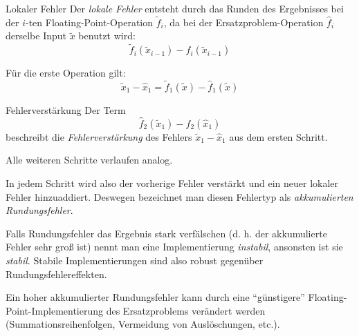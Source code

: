 \begin{defi}{Lokaler Fehler}
    Der \emph{lokale Fehler} entsteht durch das Runden des Ergebnisses bei der $i$-ten Floating-Point-Operation $\tilde{f}_i$, da bei der Ersatzproblem-Operation $\hat{f}_i$ derselbe Input $\tilde{x}$ benutzt wird:
    \[
        \tilde{f}_i (\tilde{x}_{i-1}) - \hat{f}_i (\tilde{x}_{i-1})
    \]

    Für die erste Operation gilt: 
    \[ 
        \tilde{x}_1 - \hat{x}_1 = \tilde{f}_1 (\tilde{x}) - \hat{f}_1 (\tilde{x})
    \]
\end{defi}

\begin{defi}{Fehlerverstärkung}
    Der Term 
    \[
        \hat{f}_2 (\tilde{x}_1) - \hat{f}_2 (\hat{x}_1)   
    \]
    beschreibt die \emph{Fehlerverstärkung} des Fehlers $\tilde{x}_1 - \hat{x}_1$ aus dem ersten Schritt.

    Alle weiteren Schritte verlaufen analog.

    In jedem Schritt wird also der vorherige Fehler verstärkt und ein neuer lokaler Fehler hinzuaddiert.
    Deswegen bezeichnet man diesen Fehlertyp als \emph{akkumulierten Rundungsfehler}.

    Falls Rundungsfehler das Ergebnis stark verfälschen (d. h. der akkumulierte Fehler sehr groß ist) nennt man eine Implementierung \emph{instabil}, ansonsten ist sie \emph{stabil}.
    Stabile Implementierungen sind also robust gegenüber Rundungsfehlereffekten.

    Ein hoher akkumulierter Rundungsfehler kann durch eine \enquote{günstigere} Floating-Point-Implementierung des Ersatzproblems verändert werden (Summationsreihenfolgen, Vermeidung von Auslöschungen, etc.).
\end{defi}